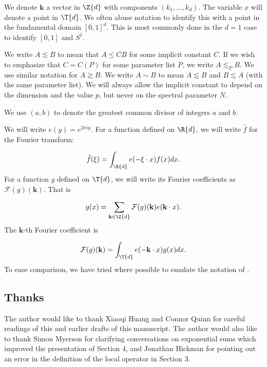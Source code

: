 \documentclass[11pt]{amsart}
\begin{document}
We denote $\mathbf{k}$ a vector in $\Z{d}$ with components $(k_1,...,k_d)$. The variable $x$ will denote a point in $\T{d}$. We often abuse notation to identify this with a point in the fundamental domain $[0,1]^d$. This is most commonly done in the $d=1$ case to identify $[0,1]$ and $S^1$.

We write $A\lesssim B$ to mean that $A\leq C B$ for some implicit constant $C$. If we wish to emphasize that $C  = C(P)$ for some parameter list $P$, we write $A\lesssim_P B$. We use similar notation for $A\gtrsim B$. We write $A\sim B$ to mean $A\lesssim B$ and $B\lesssim A$ (with the same parameter list). We will always allow the implicit constant to depend on the dimension and the value $p$, but never on the spectral parameter $N$.

We use $(a,b)$ to denote the greatest common divisor of integers $a$ and $b$.

We will write $e(y) = e^{2\pi i y}$. For a function defined on $\R{d},$ we will write $\hat{f}$ for the Fourier transform:

\begin{equation*}
    \hat{f}(\xi) = \int_{\R{d}}e(-\xi \cdot x)f(x)dx.
\end{equation*}
For a function $g$ defined on $\T{d}$, we will write its Fourier coefficients as $\mathcal{F}(g)(\mathbf{k})$. That is

\begin{equation*}
    g(x) = \sum_{\mathbf{k}\in\Z{d}}\mathcal{F}(g)(\mathbf{k})e(\mathbf{k}\cdot x).
\end{equation*}
The $\mathbf{k}$-th Fourier coefficient is 

\begin{equation*}
    \mathcal{F}(g)(\mathbf{k}) = \int_{\T{d}}e(-\mathbf{k}\cdot x)g(x)dx.
\end{equation*}
To ease comparison, we have tried where possible to emulate the notation of \cite{bourgainDemeterDiscreteRestrictImprovements2013}.

\subsection{Thanks} The author would like to thank Xiaoqi Huang and Connor Quinn for careful readings of this and earlier drafts of this manuscript. The author would also like to thank Simon Myerson for clarifying conversations on exponential sums which improved the presentation of Section 4, and Jonathan Hickman for pointing out an error in the definition of the local operator in Section 3.
\end{document}
